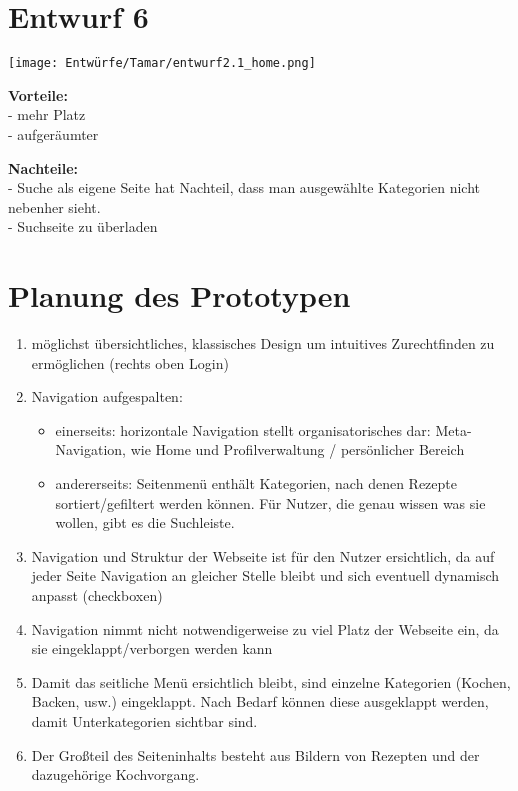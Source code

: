\documentclass[parskip,10pt,abstracton]{scrartcl}
\begin{document}
\section*{Entwurf 6} %

\texttt{[image: Entwürfe/Tamar/entwurf2.1\_home.png]}


\textbf{Vorteile:} \\
- mehr Platz\\
- aufgeräumter

\textbf{Nachteile:}\\
- Suche als eigene Seite hat Nachteil, dass man ausgewählte Kategorien nicht nebenher sieht.\\
- Suchseite zu überladen


\newpage
\section*{Planung des Prototypen}

\begin{enumerate}
 \item möglichst übersichtliches, klassisches Design um intuitives Zurechtfinden zu ermöglichen (rechts oben Login)
 \item Navigation aufgespalten:
 \begin{itemize}
  \item einerseits: horizontale Navigation stellt organisatorisches dar: Meta-Navigation, wie Home und Profilverwaltung / persönlicher Bereich
  \item andererseits: Seitenmenü enthält Kategorien, nach denen Rezepte sortiert/gefiltert werden können. Für Nutzer, die genau wissen was sie wollen, gibt es die Suchleiste.
 \end{itemize}
 \item Navigation und Struktur der Webseite ist für den Nutzer ersichtlich, da auf jeder Seite Navigation an gleicher Stelle bleibt und sich eventuell dynamisch anpasst (checkboxen)
 \item Navigation nimmt nicht notwendigerweise zu viel Platz der Webseite ein, da sie eingeklappt/verborgen werden kann
 \item Damit das seitliche Menü ersichtlich bleibt, sind einzelne Kategorien (Kochen, Backen, usw.) eingeklappt. Nach Bedarf können diese ausgeklappt werden, damit Unterkategorien sichtbar sind. 
 \item Der Großteil des Seiteninhalts besteht aus Bildern von Rezepten und der dazugehörige Kochvorgang.

\end{enumerate}
\end{document}
